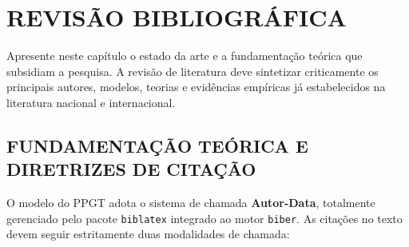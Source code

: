 \chapter{REVISÃO BIBLIOGRÁFICA}
\label{capitulo2}

Apresente neste capítulo o estado da arte e a fundamentação teórica que subsidiam a pesquisa. A revisão de literatura deve sintetizar criticamente os principais autores, modelos, teorias e evidências empíricas já estabelecidos na literatura nacional e internacional.

\section{FUNDAMENTAÇÃO TEÓRICA E DIRETRIZES DE CITAÇÃO}
\label{sec:fundamentacao}

O modelo do PPGT adota o sistema de chamada \textbf{Autor-Data}, totalmente gerenciado pelo pacote \texttt{biblatex} integrado ao motor \texttt{biber}. As citações no texto devem seguir estritamente duas modalidades de chamada:


